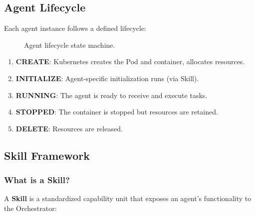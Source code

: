 \subsection{Agent Lifecycle}

Each agent instance follows a defined lifecycle:

\begin{figure}[htbp]
    \centering
    \caption{Agent lifecycle state machine.}
    \label{fig:lifecycle}
\end{figure}

\begin{enumerate}
    \item \textbf{CREATE}: Kubernetes creates the Pod and container, allocates resources.
    \item \textbf{INITIALIZE}: Agent-specific initialization runs (via Skill).
    \item \textbf{RUNNING}: The agent is ready to receive and execute tasks.
    \item \textbf{STOPPED}: The container is stopped but resources are retained.
    \item \textbf{DELETE}: Resources are released.
\end{enumerate}

\subsection{Skill Framework}

\subsubsection{What is a Skill?}
A \textbf{Skill} is a standardized capability unit that exposes an agent's functionality to the Orchestrator:

